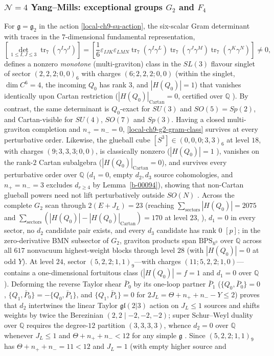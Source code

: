 \documentclass[11pt]{article}
\numberwithin{equation}{section}
\numberwithin{figure}{section}
\numberwithin{table}{section}
\newcommand{\HQ}{|H(Q_0)|}
\newcommand{\HQC}{|H(Q_0)|_{\mathrm{Cartan}}}
\begin{document}
\subsubsection{$\mathcal N=4$ Yang--Mills: exceptional groups $G_2$ and $F_4$}\label{sec-results-G2}

For $\mathfrak g=\mathfrak g_2$ in the action \eqref{local-ch9-su-action}, the six-scalar Gram determinant with traces in the $7$-dimensional fundamental representation,
\begin{equation}\label{local-ch9-g2-gram-class}
\left[\det_{1\le I,J\le 3}\operatorname{tr}_7(\gamma^I\gamma^J)\right]
=\left[\frac16\varepsilon_{IJK}\varepsilon_{LMN}
\operatorname{tr}_7(\gamma^I\gamma^L)
\operatorname{tr}_7(\gamma^J\gamma^M)
\operatorname{tr}_7(\gamma^K\gamma^N)\right]\ne0,
\end{equation}
defines a nonzero \emph{monotone} (multi-graviton) class in the $SL(3)$ flavour singlet of sector $(2,2,2;0,0)_6$ with charges $(6;2,2,2;0,0)$ (within the singlet, $\dim C^6=4$, the incoming $Q_0$ has rank $3$, and $\HQ=1$) that vanishes identically upon Cartan restriction ($\HQC=0$, certified over $\mathbb Q$ \cite[supplement, Section S5.2]{Repo}). By contrast, the same determinant is $Q_0$-exact for $SU(3)$ and $SO(5)=Sp(2)$, and Cartan-visible for $SU(4)$, $SO(7)$ and $Sp(3)$. Having a closed multi-graviton completion and $n_+=n_-=0$, \eqref{local-ch9-g2-gram-class} survives at every perturbative order. Likewise, the glueball cube $[S^3]\in(0,0,0;3,3)_6$ at level $18$, with charges $(9;3,3,3;0,0)$, is classically nonzero ($\HQ=1$ \cite{EtingofKac,CederwallFerretti}), vanishes on the rank-$2$ Cartan subalgebra ($\HQC=0$), and survives every perturbative order over $\mathbb Q$ ($d_1=0$, empty $d_2,d_3$ source cohomologies, and $n_+=n_-=3$ excludes $d_{r\ge4}$ by Lemma~\ref{b-00094}), showing that non-Cartan glueball powers need not lift perturbatively outside $SO(N)$ \cite{Repo}. Across the complete $G_2$ scan through $2(E+J_L)=23$ (reaching $\sum_{\text{sectors}}\HQ=2075$ and $\sum_{\text{sectors}}(\HQ-\HQC)=170$ at level $23$, \cite[supplement, Section S5.3]{Repo}), $d_1=0$ in every sector, no $d_2$ candidate pair exists, and every $d_3$ candidate has rank $0$ $[p]$; in the zero-derivative BMN subsector of $G_2$, graviton products span $\mathrm{BPS}_{\hbar^0}$ over $\mathbb Q$ across all $617$ nonvacuum highest-weight blocks through level $28$ (with $\HQ=0$ at odd $Y$). At level $24$, sector $(5,2,2;1,1)_9$---with charges $(11;5,2,2;1,0)$---contains a one-dimensional fortuitous class ($\HQ=f=1$ and $d_1=0$ over $\mathbb Q$). Deforming the reverse Taylor shear $\bar P_0$ by its one-loop partner $\bar P_1$ ($\{Q_0,\bar P_0\}=0$, $\{Q_1,\bar P_0\}=-\{Q_0,\bar P_1\}$, and $\{Q_1,\bar P_1\}=0$ for $2J_L=\Theta+n_++n_--Y\le2$) proves that $d_2$ intertwines the linear Taylor $\mathfrak{gl}(2|3)$ action on $J_L\le1$ sources and shifts weights by twice the Berezinian $(2,2\mid-2,-2,-2)$; super Schur--Weyl duality over $\mathbb Q$ \cite{Sergeev,BereleRegev} requires the degree-$12$ partition $(3,3,3,3)$, whence $d_2=0$ over $\mathbb Q$ whenever $J_L\le1$ and $\Theta+n_++n_-<12$ for any simple $\mathfrak g$ \cite{Repo}. Since $(5,2,2;1,1)_9$ has $\Theta+n_++n_-=11<12$ and $J_L=1$ (with empty higher source and 
\end{document}
